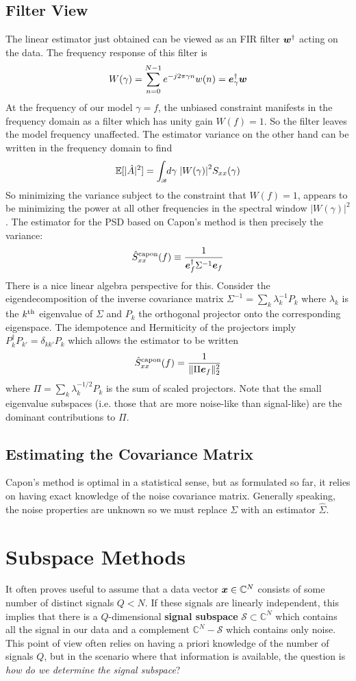 \documentclass[twocolumn]{gwclass}
\newcommand{\C}{\mathbb{C}}
\newcommand{\intbw}[1]{\int_{\hspace{-0.1em}\scriptscriptstyle\mathscr{B}}\hspace{-0.25em}}
\begin{document}
\subsection{Filter View}
The linear estimator just obtained can be viewed as an FIR filter $\boldsymbol{w}^\dagger$ acting on the data. The frequency response of this filter is
$$ W(\gamma) = \sum_{n=0}^{N-1}e^{-j2\pi \gamma n}w(n) = \boldsymbol{e}_\gamma^\dagger\boldsymbol{w}  $$
At the frequency of our model $\gamma=f$, the unbiased constraint manifests in the frequency domain as a filter which has unity gain $W(f)=1$. So the filter leaves the model frequency unaffected. The estimator variance on the other hand can be written in the frequency domain to find
$$ \mathbb{E}[|\hat{A}|^2]= \intbw{1} d\gamma\; \abs{W(\gamma)}^2S_{xx}(\gamma) $$
So minimizing the variance subject to the constraint that $W(f)=1$, appears to be minimizing the power at all other frequencies in the spectral window $|W(\gamma)|^2$. The estimator for the PSD based on Capon's method is then precisely the variance:
$$ \hat{S}_{xx}^{\text{\normalfont{capon}}}(f) \equiv \frac{1}{\boldsymbol{e}_f^\dagger \Sigma^{-1}\boldsymbol{e}_f} $$
There is a nice linear algebra perspective for this. Consider the eigendecomposition of the inverse covariance matrix $\Sigma^{-1}=\sum_k \lambda_k^{-1} P_k$ where $\lambda_k$ is the $k^{\text{\normalfont{th}}}$ eigenvalue of $\Sigma$ and $P_k$ the orthogonal projector onto the corresponding eigenspace. The idempotence and Hermiticity of the projectors imply $P_k^\dagger P_{k'}=\delta_{kk'}P_k$ which allows the estimator to be written
$$ \hat{S}_{xx}^{\text{\normalfont{capon}}}(f) = \frac{1}{ \|\Pi\boldsymbol{e}_f\|_2^2} $$
where $\Pi = \sum_k \lambda_k^{-1/2} P_k$ is the sum of scaled projectors. Note that the small eigenvalue subspaces (i.e. those that are more noise-like than signal-like) are the dominant contributions to $\Pi$.
	

\subsection{Estimating the Covariance Matrix}
Capon's method is optimal in a statistical sense, but as formulated so far, it relies on having exact knowledge of the noise covariance matrix. Generally speaking, the noise properties are unknown so we must replace $\Sigma$ with an estimator $\hat{\Sigma}$.

\section{Subspace Methods}
It often proves useful to assume that a data vector $\*x\in\C^N$ consists of some number of distinct signals $Q < N$. If these signals are linearly independent, this implies that there is a $Q$-dimensional \textbf{signal subspace} $\mathcal{S}\subset \C^N$ which contains all the signal in our data and a complement $\C^N-\mathcal{S}$ which contains only noise. This point of view often relies on having a priori knowledge of the number of signals $Q$, but in the scenario where that information is available, the question is \emph{how do we determine the signal subspace}? 
\end{document}
